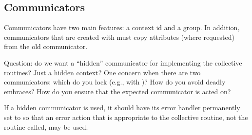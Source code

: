 \documentclass{article}
\begin{document}
\subsubsection{}

\subsection{Communicators}

Communicators have two main features: a context id and a group.  In
addition, communicators that are created with  must
copy attributes (where requested) from the old communicator.

Question: do we want a ``hidden'' communicator for implementing the
collective routines?  Just a hidden context?  One concern when there
are two communicators: which do you lock (e.g., with
)?  How do you avoid deadly embraces?  How do
you 
ensure that the expected communicator is acted on?

If a hidden communicator is used, it should have its error handler permanently
set to  so that an error action that is appropriate to
the collective routine, not the routine called, may be used.

\subsubsection{}
\subsubsection{}
\subsubsection{}
\subsubsection{}
\subsubsection{}
\subsubsection{}
\subsubsection{}
\end{document}
